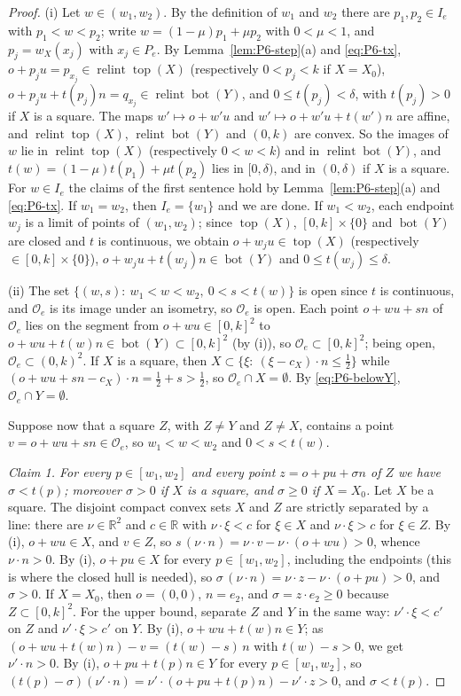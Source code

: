 \documentclass[11pt]{amsart}
\newcommand{\R}{\mathbb R}
\newcommand{\relint}{\operatorname{relint}}
\newcommand{\Bot}{\operatorname{bot}}
\newcommand{\Top}{\operatorname{top}}
\theoremstyle{definition}
\theoremstyle{remark}
\numberwithin{equation}{section}
\begin{document}
\begin{proof}
(i) Let $w\in(w_1,w_2)$. By the definition of $w_1$ and $w_2$ there are $p_1,p_2\in I_e$ with $p_1<w<p_2$; write
$w=(1-\mu)p_1+\mu p_2$ with $0<\mu<1$, and $p_j=w_X(x_j)$ with $x_j\in P_e$. By Lemma~\ref{lem:P6-step}(a) and
\eqref{eq:P6-tx}, $o+p_ju=p_{x_j}\in\relint\Top(X)$ (respectively $0<p_j<k$ if $X=X_0$),
$o+p_ju+t(p_j)n=q_{x_j}\in\relint\Bot(Y)$, and $0\le t(p_j)<\delta$, with $t(p_j)>0$ if $X$ is a square. The maps
$w'\mapsto o+w'u$ and $w'\mapsto o+w'u+t(w')n$ are affine, and $\relint\Top(X)$, $\relint\Bot(Y)$ and $(0,k)$ are
convex. So the images of $w$ lie in $\relint\Top(X)$ (respectively $0<w<k$) and in $\relint\Bot(Y)$, and
$t(w)=(1-\mu)t(p_1)+\mu t(p_2)$ lies in $[0,\delta)$, and in $(0,\delta)$ if $X$ is a square. For $w\in I_e$ the claims
of the first sentence hold by Lemma~\ref{lem:P6-step}(a) and \eqref{eq:P6-tx}. If $w_1=w_2$, then $I_e=\{w_1\}$ and
we are done. If $w_1<w_2$, each endpoint $w_j$ is a limit of points of $(w_1,w_2)$; since $\Top(X)$,
$[0,k]\times\{0\}$ and $\Bot(Y)$ are closed and $t$ is continuous, we obtain $o+w_ju\in\Top(X)$ (respectively
$\in[0,k]\times\{0\}$), $o+w_ju+t(w_j)n\in\Bot(Y)$ and $0\le t(w_j)\le\delta$.

(ii) The set $\{(w,s):\ w_1<w<w_2,\ 0<s<t(w)\}$ is open since $t$ is continuous, and $\mathcal O_e$ is its image under
an isometry, so $\mathcal O_e$ is open. Each point $o+wu+sn$ of $\mathcal O_e$ lies on the segment from
$o+wu\in[0,k]^2$ to $o+wu+t(w)n\in\Bot(Y)\subset[0,k]^2$ (by (i)), so $\mathcal O_e\subset[0,k]^2$; being open,
$\mathcal O_e\subset(0,k)^2$. If $X$ is a square, then $X\subset\{\xi:\ (\xi-c_X)\cdot n\le\frac12\}$ while
$(o+wu+sn-c_X)\cdot n=\frac12+s>\frac12$, so $\mathcal O_e\cap X=\emptyset$. By \eqref{eq:P6-belowY},
$\mathcal O_e\cap Y=\emptyset$.

Suppose now that a square $Z$, with $Z\neq Y$ and $Z\neq X$, contains a point $v=o+wu+sn\in\mathcal O_e$, so
$w_1<w<w_2$ and $0<s<t(w)$.

\emph{Claim 1. For every $p\in[w_1,w_2]$ and every point $z=o+pu+\sigma n$ of $Z$ we have $\sigma<t(p)$; moreover
$\sigma>0$ if $X$ is a square, and $\sigma\ge0$ if $X=X_0$.}
Let $X$ be a square. The disjoint compact convex sets $X$ and $Z$ are strictly separated by a line: there are
$\nu\in\R^2$ and $c\in\R$ with $\nu\cdot\xi<c$ for $\xi\in X$ and $\nu\cdot\xi>c$ for $\xi\in Z$. By (i), $o+wu\in X$,
and $v\in Z$, so $s\,(\nu\cdot n)=\nu\cdot v-\nu\cdot(o+wu)>0$, whence $\nu\cdot n>0$. By (i), $o+pu\in X$ for every
$p\in[w_1,w_2]$, including the endpoints (this is where the closed hull is needed), so
$\sigma\,(\nu\cdot n)=\nu\cdot z-\nu\cdot(o+pu)>0$, and $\sigma>0$. If $X=X_0$, then $o=(0,0)$, $n=e_2$, and
$\sigma=z\cdot e_2\ge0$ because $Z\subset[0,k]^2$. For the upper bound, separate $Z$ and $Y$ in the same way:
$\nu'\cdot\xi<c'$ on $Z$ and $\nu'\cdot\xi>c'$ on $Y$. By (i), $o+wu+t(w)n\in Y$; as $(o+wu+t(w)n)-v=(t(w)-s)\,n$
with $t(w)-s>0$, we get $\nu'\cdot n>0$. By (i), $o+pu+t(p)n\in Y$ for every $p\in[w_1,w_2]$, so
$(t(p)-\sigma)(\nu'\cdot n)=\nu'\cdot(o+pu+t(p)n)-\nu'\cdot z>0$, and $\sigma<t(p)$.


\end{proof}
\end{document}
